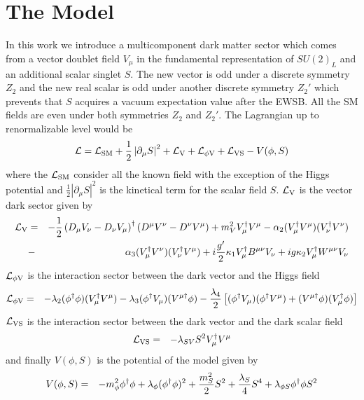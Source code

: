 \section{The Model} \label{DMM}
In this work we introduce a multicomponent dark matter sector which comes from a vector doublet field $V_{\mu}$ in the fundamental representation of $SU(2)_L$ and an additional scalar singlet $S$. The new vector is odd under a discrete symmetry $Z_2$ and the new real scalar is odd under another discrete symmetry $Z_2'$ which prevents that $S$ acquires a vacuum expectation value after the EWSB. All the SM fields are even under both symmetries $Z_2$ and $Z_2'$. The Lagrangian up to renormalizable level would be
\begin{equation}
{\cal L} = {\cal L}_{\text{SM}} + \frac{1}{2}\left|\partial_{\mu} S\right|^2 + {\cal L}_{\text{V}} + {\cal L}_{\phi\text{V}} + {\cal L}_{\text{VS}} - V(\phi, S) \label{Lagrangian}
\end{equation}
where the ${\cal L}_{\text{SM}}$ consider all the known field with the exception of the Higgs potential and $\frac{1}{2}\left|\partial_{\mu} S\right|^2$ is the kinetical term for the scalar field $S$. ${\cal L}_{\text{V}}$ is the vector dark sector given by
\begin{eqnarray}
{\cal L}_{\text{V}} &=& -\frac{1}{2}\left(D_{\mu} V_{\nu} - D_{\nu} V_{\mu} \right)^{\dagger} \left(D^{\mu} V^{\nu} - D^{\nu} V^{\mu} \right) + m_V^2 \vdag[\mu] V^{\mu} - \alpha_2 (\vdag[\mu] V^{\mu}) (\vdag[\nu] V^{\nu}) \nonumber \\
&-& \alpha_3 (\vdag[\mu] V^{\nu}) (\vdag[\nu] V^{\mu}) + i\frac{g'}{2}\kappa_1 V_\mu^\dagger B^{\mu\nu} V_\nu + ig\kappa_2V_\mu^\dagger W^{\mu\nu} V_\nu
\end{eqnarray}
${\cal L}_{\phi\text{V}}$ is the interaction sector between the dark vector and the Higgs field
\begin{eqnarray}
{\cal L}_{\phi\text{V}} &=& - \lambda_2(\phidag \phi) (\vdag[\mu]V^{\mu}) - \lambda_3(\phidag V_{\mu})(\Vdag[\mu]\phi) - \frac{\lambda_4}{2} \left[(\phidag V_{\mu})(\phidag V^{\mu}) + (\Vdag[\mu]\phi)(\vdag[\mu]\phi)\right]
\end{eqnarray}
${\cal L}_{\text{VS}}$ is the interaction sector between the dark vector and the dark scalar field
\begin{eqnarray}
{\cal L}_{\text{VS}} &=& - \lambda_{SV}S^2 V_{\mu}^{\dagger}V^{\mu}
\end{eqnarray}
and finally $V(\phi, S)$ is the potential of the model given by
\begin{eqnarray}
V(\phi, S) &=& -m_{\phi}^2\phi^{\dagger}\phi + \ld[\phi](\phi^{\dagger}\phi)^2 + \frac{m_{S}^2}{2}S^2 + \frac{\lambda_S}{4}S^4 + \lambda_{\phi S}\phi^{\dagger}\phi S^2
\end{eqnarray}

